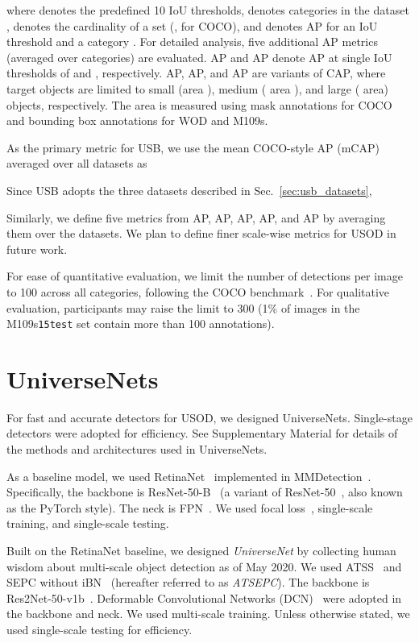 \documentclass[10pt,twocolumn,letterpaper]{article}
\newcommand{\Univs}{UniverseNets\xspace}
\newcommand{\OurOrig}{UniverseNet\xspace}
\def\AppendixSection{Supplementary Material\xspace}
\newcommand{\APS}{AP\xspace}
\newcommand{\APM}{AP\xspace}
\newcommand{\APL}{AP\xspace}
\newcommand{\MangasAbbr}{M109s\xspace}
\begin{document}
where
 denotes the predefined 10 IoU thresholds,
 denotes categories in the dataset ,
 denotes the cardinality of a set (\eg,  for COCO),
and  denotes AP for an IoU threshold  and a category .
For detailed analysis, five additional AP metrics (averaged over categories) are evaluated.
AP and AP denote AP at single IoU thresholds of  and , respectively.
\APS, \APM, and \APL are variants of CAP, where target objects are limited to
small (area ),
medium ( area ),
and large ( area) objects, respectively.
The area is measured using mask annotations for COCO and bounding box annotations for WOD and \MangasAbbr.

As the primary metric for USB,
we use the mean COCO-style AP (mCAP)
averaged over all datasets  as

Since USB adopts the three datasets described in Sec.~\ref{sec:usb_datasets},

Similarly,
we define five metrics from
AP, AP, \APS, \APM, and \APL
by averaging them over the datasets.
We plan to define finer scale-wise metrics for USOD in future work.

For ease of quantitative evaluation,
we limit the number of detections per image to 100 across all categories, following the COCO benchmark~\cite{cocoapi}.
For qualitative evaluation, participants may raise the limit to 300
(1\% of images in the \MangasAbbr \texttt{15test} set contain more than 100 annotations).



\section{\Univs}

For fast and accurate detectors for USOD, we designed \Univs.
Single-stage detectors were adopted for efficiency.
See \AppendixSection for details of the methods and architectures used in \Univs.

As a baseline model,
we used RetinaNet~\cite{RetinaNet_ICCV2017} implemented in MMDetection~\cite{MMDetection}.
Specifically,
the backbone is ResNet-50-B~\cite{BagOfTricks_Classification_CVPR2019} (a variant of ResNet-50~\cite{ResNet_CVPR2016}, also known as the PyTorch style).
The neck is FPN~\cite{FPN_CVPR2017}.
We used focal loss~\cite{RetinaNet_ICCV2017}, single-scale training, and single-scale testing.

Built on the RetinaNet baseline,
we designed \textit{\OurOrig} by collecting human wisdom about multi-scale object detection as of May 2020.
We used ATSS~\cite{ATSS_CVPR2020} and SEPC without iBN~\cite{SEPC_CVPR2020}
(hereafter referred to as \textit{ATSEPC}).
The backbone is Res2Net-50-v1b~\cite{Res2Net_TPAMI2020, Res2Net_PretrainedModels}.
Deformable Convolutional Networks (DCN)~\cite{DCN_ICCV2017} were adopted in the backbone and neck.
We used multi-scale training.
Unless otherwise stated, we used single-scale testing for efficiency.
\end{document}
